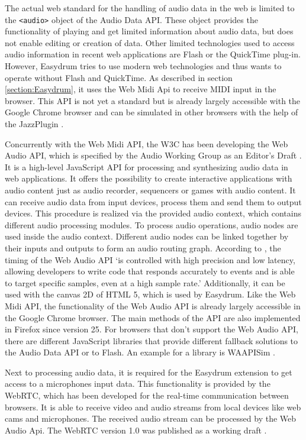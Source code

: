 The actual web standard for the handling of audio data in the web is limited to the \lstinline{<audio>} object of the Audio Data API. These object provides the functionality of playing and get limited information about audio data, but does not enable editing or creation of data. Other limited technologies used to access audio information in recent web applications are Flash or the QuickTime plug-in. However, Easydrum tries to use modern web technologies and thus wants to operate without Flash and QuickTime. As described in section \ref{section:Easydrum}, it uses the Web Midi Api \autocite{WebMidiApi:2015} to receive MIDI input in the browser. This API is not yet a standard but is already largely accessible with the Google Chrome browser and can be simulated in other browsers with the help of the JazzPlugin \autocite{JazzPlugin:2015}.

Concurrently with the Web Midi API, the W3C has been developing the Web Audio API, which is specified by the Audio Working Group as an Editor's Draft \autocite{WebAudioApi:2015}. It is a high-level JavaScript API for processing and synthesizing audio data in web applications. It offers the possibility to create interactive applications with audio content just as audio recorder, sequencers or games with audio content. It can receive audio data from input devices, process them and send them to output devices. This procedure is realized via the provided audio context, which contains different audio processing modules. To process audio operations, audio nodes are used inside the audio context. Different audio nodes can be linked together by their inputs and outputs to form an audio routing graph. According to \autocite{WebMidiApiMDN:2015}, the timing of the Web Audio API `is controlled with high precision and low latency, allowing developers to write code that responds accurately to events and is able to target specific samples, even at a high sample rate.' Additionally, it can be used with the canvas 2D of HTML 5, which is used by Easydrum. Like the Web Midi API, the functionality of the Web Audio API is already largely accessible in the Google Chrome browser. The main methods of the API are also implemented in Firefox since version 25. For browsers that don't support the Web Audio API, there are different JavaScript libraries that provide different fallback solutions to the Audio Data API or to Flash. An example for a library is WAAPISim \autocite{WAAPISim:2015}.

Next to processing audio data, it is required for the Easydrum extension to get access to a microphones input data. This functionality is provided by the WebRTC, which has been developed for the real-time communication between browsers. It is able to receive video and audio streams from local devices like web cams and microphones. The received audio stream can be processed by the Web Audio Api. The WebRTC version 1.0 was published as a working draft \autocite{WebRTC:2015}. 

